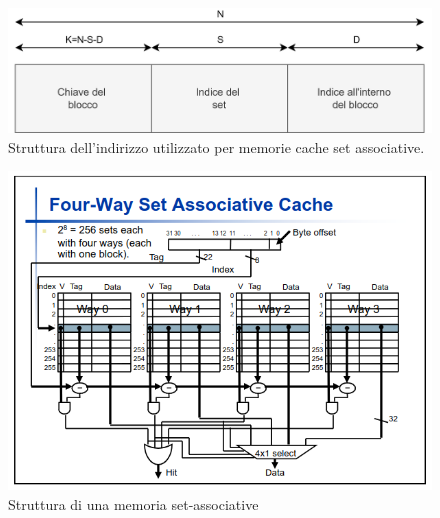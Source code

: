 \begin{figure}[!h]
    \centering
    \includegraphics[width=0.6\linewidth]{img/indirizzo-setass.png}
    \caption{Struttura dell'indirizzo utilizzato per memorie cache set associative.}
    \label{fig:indirizzo-setass}
\end{figure}
\begin{figure}[!h]
    \centering
    \includegraphics[width=0.6\linewidth]{img/set-associative.png}
    \caption{Struttura di una memoria set-associative}
    \label{fig:mem-setass}
\end{figure}


